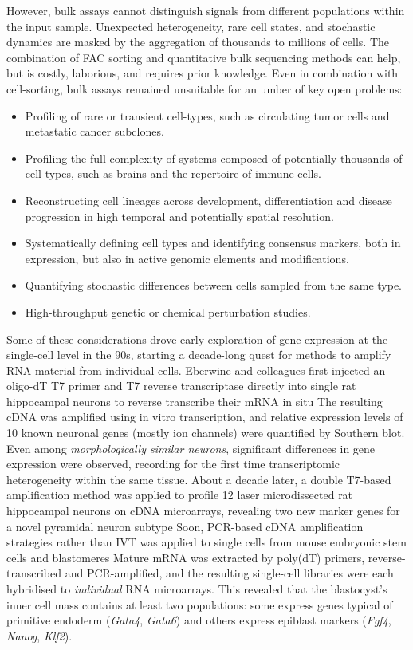 However, bulk assays cannot distinguish signals from different populations within the input sample. Unexpected heterogeneity, rare cell states, and stochastic dynamics are masked by the aggregation of thousands to millions of cells. The combination of FAC sorting and quantitative bulk sequencing methods can help, but is costly, laborious, and requires prior knowledge. Even in combination with cell-sorting, bulk assays remained unsuitable for an umber of key open problems:

\begin{itemize}[noitemsep]
	\item Profiling of rare or transient cell-types, such as circulating tumor cells and metastatic cancer subclones.
	\item Profiling the full complexity of systems composed of potentially thousands of cell types, such as brains and the repertoire of immune cells.
	\item Reconstructing cell lineages across development, differentiation and disease progression in high temporal and potentially spatial resolution.
	\item Systematically defining cell types and identifying consensus markers, both in expression, but also in active genomic elements and modifications.
	\item Quantifying stochastic differences between cells sampled from the same type.
	\item High-throughput genetic or chemical perturbation studies.
\end{itemize}

Some of these considerations drove early exploration of gene expression at the single-cell level in the 90s, starting a decade-long quest for methods to amplify RNA material from individual cells. Eberwine and colleagues first injected an oligo-dT T7 primer and T7 reverse transcriptase directly into single rat hippocampal neurons to reverse transcribe their mRNA in situ The resulting cDNA was amplified using in vitro transcription, and relative expression levels of 10 known neuronal genes (mostly ion channels) were quantified by Southern blot. Even among \textit{morphologically similar neurons}, significant differences in gene expression were observed, recording for the first time transcriptomic heterogeneity within the same tissue. About a decade later, a double T7-based amplification method was applied to profile 12 laser microdissected rat hippocampal neurons on cDNA microarrays, revealing two new marker genes for a novel pyramidal neuron subtype Soon, PCR-based cDNA amplification strategies rather than IVT was applied to single cells from mouse embryonic stem cells and blastomeres Mature mRNA was extracted by poly(dT) primers, reverse-transcribed and PCR-amplified, and the resulting single-cell libraries were each hybridised to \textit{individual} RNA microarrays. This revealed that the blastocyst's inner cell mass contains at least two populations: some express genes typical of primitive endoderm (\textit{Gata4}, \textit{Gata6}) and others express epiblast markers (\textit{Fgf4}, \textit{Nanog}, \textit{Klf2}).

